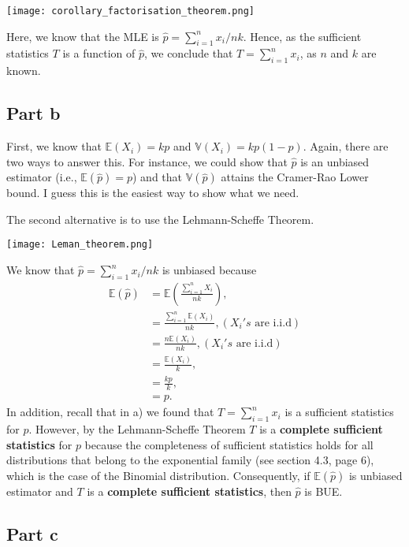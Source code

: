 \documentclass[12pt]{article}
\begin{document}
\texttt{[image: corollary\_factorisation\_theorem.png]}

Here, we know that the MLE is $\hat{p} = \sum_{i=1}^{n}x_{i}/nk$. Hence, as the sufficient statistics $T$ is a function of $\hat{p}$, we conclude that $T = \sum_{i=1}^{n}x_{i}$, as $n$ and $k$ are known.

\subsection*{Part b}

First, we know that $\mathbb{E}(X_{i}) = kp$ and $\mathbb{V}(X_{i}) = kp(1-p)$. Again, there are two ways to answer this. For instance, we could show that $\hat{p}$ is an unbiased estimator (i.e., $\mathbb{E}(\hat{p})= p$) and that $\mathbb{V}(\hat{p})$ attains the Cramer-Rao Lower bound. I guess this is the easiest way to show what we need.

The second alternative is to use the Lehmann-Scheffe Theorem.

\texttt{[image: Leman\_theorem.png]}

We know that $\hat{p} = \sum_{i=1}^{n}x_{i}/nk$ is unbiased because
\begin{align}
\mathbb{E}(\hat{p}) & = \mathbb{E}\left(\frac{\sum_{i=1}^{n}X_{i}}{nk}\right), \\
& = \frac{\sum_{i=1}^{n} \mathbb{E}(X_{i}) }{nk} , (X_{i}'s \mbox{ are i.i.d})\\
& = \frac{n \mathbb{E}(X_{i}) }{nk} , (X_{i}'s \mbox{ are i.i.d}) \\
& = \frac{\mathbb{E}(X_{i}) }{k} , \\
& = \frac{kp}{k}, \\
& = p.
\end{align}
In addition, recall that in a) we found that $T = \sum_{i=1}^{n}x_{i}$ is a sufficient statistics for $p$. However, by the Lehmann-Scheffe Theorem $T$ is a \textbf{complete sufficient statistics} for $p$ because the completeness of sufficient statistics holds for all distributions that belong to the exponential family (see section 4.3, page 6), which is the case of the Binomial distribution. Consequently, if $\mathbb{E}(\hat{p})$ is unbiased estimator and $T$ is a \textbf{complete sufficient statistics}, then $\hat{p}$ is BUE.

\subsection*{Part c}
\end{document}
